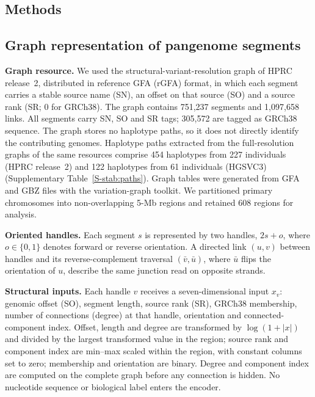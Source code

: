 \documentclass[11pt]{article}
\begin{document}
\begin{bibunit}[unsrtnat]
\section{Methods}
\label{sec:methods}

\subsection{Graph representation of pangenome segments}
\label{sec:representation}

\textbf{Graph resource.} We used the structural-variant-resolution graph of HPRC release~2, distributed in reference GFA (rGFA) format\cite{li2020minigraph}, in which each segment carries a stable source name (SN), an offset on that source (SO) and a source rank (SR; 0 for GRCh38). The graph contains 751,237 segments and 1,097,658 links. All segments carry SN, SO and SR tags; 305,572 are tagged as GRCh38 sequence. The graph stores no haplotype paths, so it does not directly identify the contributing genomes. Haplotype paths extracted from the full-resolution graphs of the same resources comprise 454 haplotypes from 227 individuals (HPRC release~2) and 122 haplotypes from 61 individuals (HGSVC3) (Supplementary Table~\ref{S-stab:paths}). %
Graph tables were generated from GFA and GBZ files with the variation-graph toolkit\cite{garrison2018variation,siren2022gbz}. We partitioned primary chromosomes into non-overlapping 5-Mb regions and retained 608 regions for analysis.

\textbf{Oriented handles.} Each segment $s$ is represented by two handles, $2s+o$, where $o\in\{0,1\}$ denotes forward or reverse orientation. A directed link $(u,v)$ between handles and its reverse-complement traversal $(\bar v,\bar u)$, where $\bar u$ flips the orientation of $u$, describe the same junction read on opposite strands.

\textbf{Structural inputs.} Each handle $v$ receives a seven-dimensional input $x_v$: genomic offset (SO), segment length, source rank (SR), GRCh38 membership, number of connections (degree) at that handle, orientation and connected-component index. Offset, length and degree are transformed by $\log(1+|x|)$ and divided by the largest transformed value in the region; source rank and component index are min--max scaled within the region, with constant columns set to zero; membership and orientation are binary. Degree and component index are computed on the complete graph before any connection is hidden. No nucleotide sequence or biological label enters the encoder.


\end{bibunit}
\end{document}

